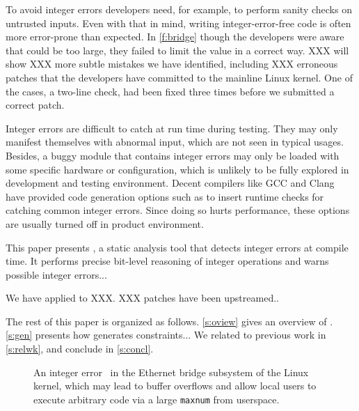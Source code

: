To avoid integer errors developers need, for example, to perform
sanity checks on untrusted inputs.  Even with that in mind, writing
integer-error-free code is often more error-prone than expected.
In \autoref{f:bridge} though the developers were aware that 
could be too large, they failed to limit the value in a correct
way.  XXX will show XXX more subtle mistakes we have identified,
including XXX erroneous patches that the developers have committed
to the mainline Linux kernel.  One of the cases, a two-line check,
had been fixed three times before we submitted a correct patch.

Integer errors are difficult to catch at run time during testing.
They may only manifest themselves with abnormal input, which are
not seen in typical usages.  Besides, a buggy module that contains
integer errors may only be loaded with some specific hardware or
configuration, which is unlikely to be fully explored in development
and testing environment.  Decent compilers like GCC and Clang have
provided code generation options such as  to insert
runtime checks for catching common integer errors.  Since doing so
hurts performance, these options are usually turned off in product
environment.

This paper presents \sys, a static analysis tool that detects integer
errors at compile time.  It performs precise bit-level reasoning
of integer operations and warns possible integer errors...

We have applied \sys to XXX.  XXX patches have been upstreamed..

The rest of this paper is organized as follows. \autoref{s:oview}
gives an overview of \sys.  \autoref{s:gen} presents how \sys
generates constraints...  We related \sys to previous work in
\autoref{s:relwk}, and conclude in \autoref{s:concl}.

\begin{figure}

\caption{An integer error~\cite[CVE-2006-5751]{cve} in the Ethernet
bridge subsystem of the Linux kernel, which may lead to buffer
overflows and allow local users to execute arbitrary code via a
large \texttt{maxnum} from userspace.}
\label{f:bridge}
\end{figure}
